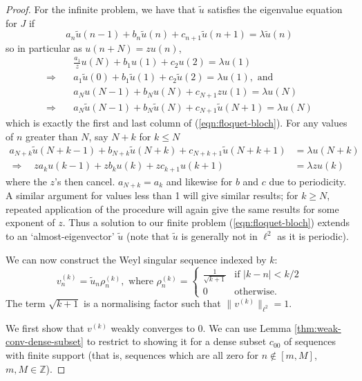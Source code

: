\documentclass[../main.tex]{subfiles}
\begin{document}
\begin{proof} For the infinite problem, we have that $\tilde{u}$ satisfies
  the eigenvalue equation for $J$ if
  $$a_n \tilde{u}(n-1) + b_n \tilde{u}(n) + c_{n+1} \tilde{u}(n+1) = \lambda \tilde{u}(n)$$
so in particular as $u(n + N) = z u(n)$, 
\begin{align*}
  & \frac{a_1}{z} u(N) + b_1 u(1) + c_2 u(2) = \lambda u(1)\\
  \Rightarrow \quad& a_1 \tilde{u}(0) + b_1 \tilde{u}(1) + c_2 \tilde{u}(2) 
	    = \lambda u(1), \text{ and } \\
  & a_N u(N-1) + b_N u(N) + c_{N+1} z u(1) = \lambda u(N)\\
  \Rightarrow \quad& a_N \tilde{u}(N-1) + b_N \tilde{u}(N) + c_{N+1} \tilde{u}(N+1) 
            = \lambda u(N)
\end{align*}
which is exactly the first and last column of (\ref{eqn:floquet-bloch}). For any values of
$n$ greater than $N$, say $N + k$ for $k \leq N$ 
\begin{align*}
  a_{N+k} \tilde{u}(N+k-1) + b_{N+k} \tilde{u}(N+k) + c_{N+k+1} \tilde{u}(N+k+1)
    & = \lambda u(N+k) \\
  \Rightarrow \quad z a_{k} u(k-1) + z b_{k} u(k) + z c_{k+1} u(k+1) & = \lambda z u(k)
\end{align*} 
where the $z$'s then cancel. $a_{N+k} = a_{k}$ and likewise for $b$ and $c$ due to periodicity.
A similar argument for values less than 1 will give similar results; for $k \geq N$, repeated
application of the procedure will again give the same results for some exponent of $z$.
Thus a solution to our finite problem (\ref{eqn:floquet-bloch}) extends to an `almost-eigenvector'
$\tilde{u}$ (note that $\tilde{u}$ is generally not in $\ell^2$ as it is periodic).

We can now construct the Weyl singular sequence indexed by $k$:
$$
  v_n^{(k)} = {\tilde{u}_n} \rho_n^{(k)}, \text{ where }
  \rho_n^{(k)} =
  \begin{cases}
    \frac{1}{\sqrt{k+1}} & \text{if } |k-n| < k/2 \\
    0 & \text{otherwise.}
  \end{cases}
$$
  The term $\sqrt{k+1}$ is a normalising factor such that $\|v^{(k)}\|_{\ell^2} = 1$.

We first show that $v^{(k)}$ weakly converges to 0. We can use Lemma
\ref{thm:weak-conv-dense-subset} to restrict to showing it for a dense subset
$c_{00}$ of sequences with finite support (that is, sequences which are
all zero for $n \notin [m, M]$, $m, M \in \mathbb{Z}$).


\end{proof}
\end{document}
